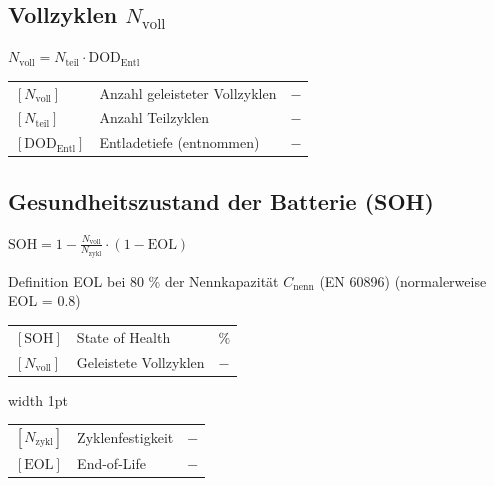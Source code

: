 \subsection{Vollzyklen $N_{\text{voll}}$}

\begin{minipage}[t]{0.25\columnwidth}
$
\boxed{N_{\text{voll}} = N_{\text{teil}} \cdot \mathrm{DOD_{Entl}}}
$
\end{minipage}
\hfill
\begin{minipage}[t]{0.71\columnwidth}
    \renewcommand{\arraystretch}{1.2}
        \begin{tabular}{@{} l p{4.5cm} l @{}}
            $[N_{\text{voll}}]$  & Anzahl geleisteter Vollzyklen \dotfill          & $-$ \\
            $[N_{\text{teil}}]$  & Anzahl Teilzyklen \dotfill                        & $-$ \\
            $[\mathrm{DOD_{Entl}}]$       & Entladetiefe (entnommen) \dotfill & $-$ \\
    \end{tabular}
\end{minipage}


\subsection{Gesundheitszustand der Batterie (SOH)}

\begin{minipage}[t]{0.32\columnwidth}
$
\boxed{\text{SOH} = 1 - \frac{N_{\text{voll}}}{N_{\text{zykl}}}\cdot (1 - \text{EOL})}
$
\end{minipage}
\hfill
\begin{minipage}[c]{0.58\columnwidth}
    Definition EOL bei 80 \% der Nennkapazität $C_{\mathrm{nenn}}$ (EN 60896) (normalerweise EOL = 0.8)
\end{minipage}

\vspace{0.1cm}

\begin{minipage}[t]{0.48\columnwidth}
    \renewcommand{\arraystretch}{1.2}
    \begin{tabular}{@{} l p{2.8cm} l @{}}
        $[\text{SOH}]$        & State of Health     \dotfill    & $\mathrm{\%}$ \\
        $[N_{\text{voll}}]$   & Geleistete Vollzyklen               \dotfill              & $-$ \\
    \end{tabular}
\end{minipage}
\hfill
\vrule width 1pt
\hfill
\begin{minipage}[t]{0.48\columnwidth}
    \renewcommand{\arraystretch}{1.2}
    \begin{tabular}{@{} l p{2.8cm} l @{}}
        $[N_{\text{zykl}}]$   & Zyklenfestigkeit                    \dotfill                   & $-$ \\
        $[\text{EOL}]$        & End-of-Life                  \dotfill & $-$ \\
    \end{tabular}
\end{minipage}



